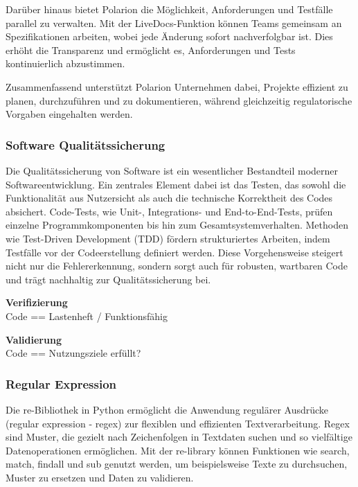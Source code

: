 \documentclass[a4paper, 12pt]{article}
\begin{document}
Darüber hinaus bietet Polarion die Möglichkeit, Anforderungen und Testfälle parallel zu verwalten. Mit der LiveDocs-Funktion können Teams gemeinsam an Spezifikationen arbeiten, wobei jede Änderung sofort nachverfolgbar ist. Dies erhöht die Transparenz und ermöglicht es, Anforderungen und Tests kontinuierlich abzustimmen.

Zusammenfassend unterstützt Polarion Unternehmen dabei, Projekte effizient zu planen, durchzuführen und zu dokumentieren, während gleichzeitig regulatorische Vorgaben eingehalten werden. \cite{polarion_web}


\subsubsection{Software Qualitätssicherung}
Die Qualitätssicherung von Software ist ein wesentlicher Bestandteil moderner Softwareentwicklung. Ein zentrales Element dabei ist das Testen, das sowohl die Funktionalität aus Nutzersicht als auch die technische Korrektheit des Codes absichert. Code-Tests, wie Unit-, Integrations- und End-to-End-Tests, prüfen einzelne Programmkomponenten bis hin zum Gesamtsystemverhalten. Methoden wie Test-Driven Development (TDD) fördern strukturiertes Arbeiten, indem Testfälle vor der Codeerstellung definiert werden. Diese Vorgehensweise steigert nicht nur die Fehlererkennung, sondern sorgt auch für robusten, wartbaren Code und trägt nachhaltig zur Qualitätssicherung bei. \cite{grundlagen_sw_entwicklung}

\textbf{Verifizierung}\\
Code == Lastenheft / Funktionsfähig %

\textbf{Validierung}\\
Code == Nutzungsziele erfüllt? %



\subsubsection{Regular Expression}\label{regularExpression}
Die re-Bibliothek in Python ermöglicht die Anwendung regulärer Ausdrücke (regular expression - regex) zur flexiblen und effizienten Textverarbeitung. Regex sind Muster, die gezielt nach Zeichenfolgen in Textdaten suchen und so vielfältige Datenoperationen ermöglichen. Mit der re-library können Funktionen wie search, match, findall und sub genutzt werden, um beispielsweise Texte zu durchsuchen, Muster zu ersetzen und Daten zu validieren. \cite{regex_lib}
\end{document}
